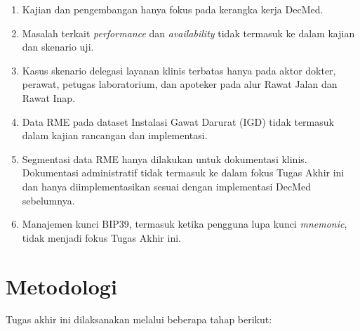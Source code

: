 \documentclass[bahasa, 12pt, a4paper, onecolumn, oneside, final]{report}
\begin{document}
\begin{enumerate}
	\item Kajian dan pengembangan hanya fokus pada kerangka kerja DecMed.
	\item Masalah terkait \textit{performance} dan \textit{availability} tidak termasuk ke dalam kajian dan skenario uji.
	\item Kasus skenario delegasi layanan klinis terbatas hanya pada aktor dokter, perawat, petugas laboratorium, dan apoteker pada alur Rawat Jalan dan Rawat Inap.
	\item Data RME pada dataset Instalasi Gawat Darurat (IGD) tidak termasuk dalam kajian rancangan dan implementasi.
	\item Segmentasi data RME hanya dilakukan untuk dokumentasi klinis. Dokumentasi administratif tidak termasuk ke dalam fokus Tugas Akhir ini dan hanya diimplementasikan sesuai dengan implementasi DecMed sebelumnya.
	\item Manajemen kunci BIP39, termasuk ketika pengguna lupa kunci \textit{mnemonic}, tidak menjadi fokus Tugas Akhir ini.
\end{enumerate}

\section{Metodologi}

Tugas akhir ini dilaksanakan melalui beberapa tahap berikut:
\end{document}

